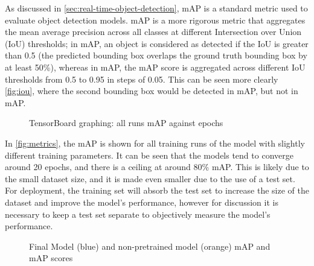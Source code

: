 As discussed in \autoref{sec:real-time-object-detection}, mAP is a standard metric used to evaluate object detection models. mAP is a more rigorous metric that aggregates the mean average precision across all classes at different Intersection over Union (IoU) thresholds; in mAP, an object is considered as detected if the IoU is greater than 0.5 (the predicted bounding box overlaps the ground truth bounding box by at least 50\%), whereas in mAP, the mAP score is aggregated across different IoU thresholds from 0.5 to 0.95 in steps of 0.05. This can be seen more clearly \autoref{fig:iou}, where the second bounding box would be detected in mAP, but not in mAP.
  
\begin{figure}[H]
  \centering
   
  \caption{TensorBoard graphing: all runs mAP against epochs}
  \label{fig:metrics}
\end{figure}
  
In \autoref{fig:metrics}, the mAP is shown for all training runs of the model with slightly different training parameters. It can be seen that the models tend to converge around 20 epochs, and there is a ceiling at around 80\% mAP. This is likely due to the small dataset size, and it is made even smaller due to the use of a test set. For deployment, the training set will absorb the test set to increase the size of the dataset and improve the model's performance, however for discussion it is necessary to keep a test set separate to objectively measure the model's performance.


\begin{figure}[H]
  \centering
  \begin{minipage}[t]{0.8\textwidth}
    \centering
    
  \end{minipage}
  \par\medskip
  \begin{minipage}[t]{0.8\textwidth}
    \centering
    
  \end{minipage}
  \caption{Final Model (blue) and non-pretrained model (orange) mAP and mAP scores}
  \label{fig:final-model-metrics}
\end{figure}

